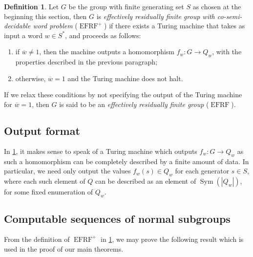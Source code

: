 \documentclass[a4paper]{amsart}
\numberwithin{equation}{section}
\theoremstyle{definition}
\newtheorem{definition}[theorem]{Definition}
\theoremstyle{remark}
\DeclareMathOperator{\EFRF}{EFRF}
\DeclareMathOperator{\Sym}{Sym}
\begin{document}
\begin{definition}\label{def:eff-res-fin}
Let $G$ be the group with finite generating set $S$ as chosen at the beginning this section, then $G$ is \emph{effectively residually finite group with co-semi-decidable word problem} ($\EFRF^{+}$) if there exists a Turing machine that takes as input a word $w\in S^*$, and proceeds as follows:
\begin{enumerate}
    \item[$(\mathrm{E1})$] if $\overline w \neq 1$, then the machine outputs a homomorphism $f_w\colon G\to Q_w$, with the properties described in the previous paragraph;
    \item[$(\mathrm{E2})$] otherwise, $\overline w = 1$ and the Turing machine does not halt.
\end{enumerate}
If we relax these conditions by not specifying the output of the Turing machine for $\overline w = 1$, then $G$ is said to be an \emph{effectively residually finite group} ($\EFRF$).
\end{definition}

\subsection{Output format}\label{sec:output-formats}
In \cref{def:eff-res-fin}, it makes sense to speak of a Turing machine which outputs $f_w\colon G\to Q_w$ as such a homomorphism can be completely described by a finite amount of data.
In particular, we need only output the values $f_w(s) \in Q_w$ for each generator $s\in S$, where each such element of $Q$ can be described as an element of $\Sym(|Q_w|)$, for some fixed enumeration of $Q_w$.

\subsection{Computable sequences of normal subgroups}
From the definition of $\EFRF^{+}$ in \cref{def:eff-res-fin}, we may prove the following result which is used in the proof of our main theorems.
\end{document}
